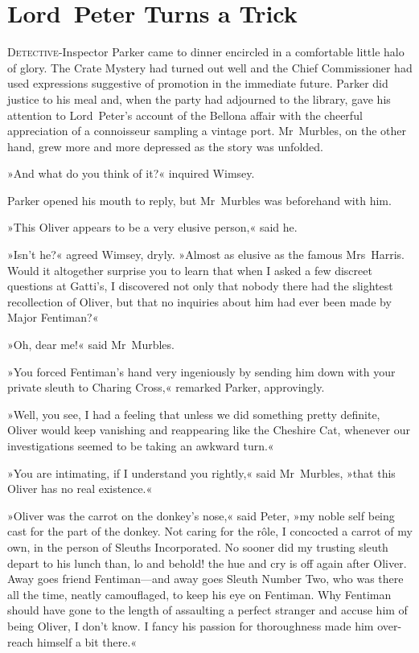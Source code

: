 \chapter{Lord~Peter Turns a Trick}
\lettrine[lines=4]{D}{etective}-Inspector Parker came to dinner encircled in a comfortable little halo of glory. The Crate Mystery had turned out well and the Chief Commissioner had used expressions suggestive of promotion in the immediate future. Parker did justice to his meal and, when the party had adjourned to the library, gave his attention to Lord~Peter's account of the Bellona affair with the cheerful appreciation of a connoisseur sampling a vintage port. Mr~Murbles, on the other hand, grew more and more depressed as the story was unfolded.

»And what do you think of it?« inquired Wimsey.

Parker opened his mouth to reply, but Mr~Murbles was beforehand with him.

»This Oliver appears to be a very elusive person,« said he.

»Isn't he?« agreed Wimsey, dryly. »Almost as elusive as the famous Mrs~Harris. Would it altogether surprise you to learn that when I asked a few discreet questions at Gatti's, I discovered not only that nobody there had the slightest recollection of Oliver, but that no inquiries about him had ever been made by Major Fentiman?«

»Oh, dear me!« said Mr~Murbles.

»You forced Fentiman's hand very ingeniously by sending him down with your private sleuth to Charing Cross,« remarked Parker, approvingly.

»Well, you see, I had a feeling that unless we did something pretty definite, Oliver would keep vanishing and reappearing like the Cheshire Cat, whenever our investigations seemed to be taking an awkward turn.«

»You are intimating, if I understand you rightly,« said Mr~Murbles, »that this Oliver has no real existence.«

»Oliver was the carrot on the donkey's nose,« said Peter, »my noble self being cast for the part of the donkey. Not caring for the rôle, I concocted a carrot of my own, in the person of Sleuths Incorporated. No sooner did my trusting sleuth depart to his lunch than, lo and behold! the hue and cry is off again after Oliver. Away goes friend Fentiman—and away goes Sleuth Number Two, who was there all the time, neatly camouflaged, to keep his eye on Fentiman. Why Fentiman should have gone to the length of assaulting a perfect stranger and accuse him of being Oliver, I don't know. I fancy his passion for thoroughness made him over-reach himself a bit there.«

